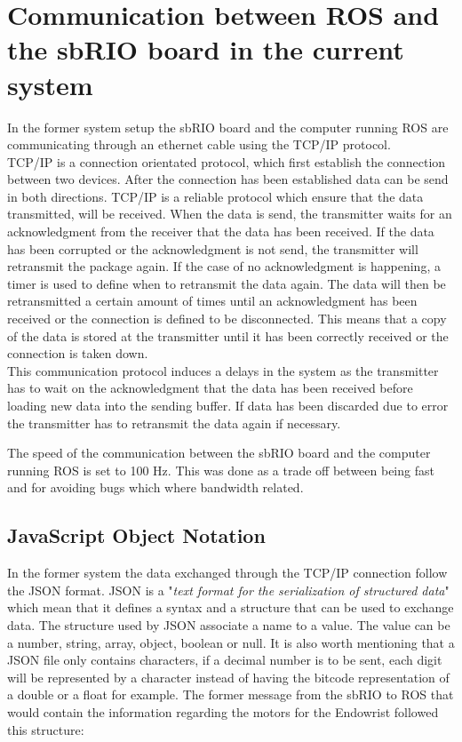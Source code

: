 \section{Communication between ROS and the sbRIO board in the current system}


In the former system setup the sbRIO board and the computer running ROS are communicating through an ethernet cable using the TCP/IP protocol.\\ 
TCP/IP is a connection orientated protocol, which first establish the connection between two devices\cite{TCP_IP_UDP}. After the connection has been established data can be send in both directions. TCP/IP is a reliable protocol which ensure that the data transmitted, will be received. When the data is send, the transmitter waits for an acknowledgment from the receiver that the data has been received. If the data has been corrupted or the acknowledgment is not send, the transmitter will retransmit the package again. If the case of no acknowledgment is happening, a timer is used to define when to retransmit the data again. The data will then be retransmitted a certain amount of times until an acknowledgment has been received or the connection is defined to be disconnected. This means that a copy of the data is stored at the transmitter until it has been correctly received or the connection is taken down.\\
This communication protocol induces a delays in the system as the transmitter has to wait on the acknowledgment that the data has been received before loading new data into the sending buffer. If data has been discarded due to error the transmitter has to retransmit the data again if necessary.  

The speed of the communication between the sbRIO board and the computer running ROS is set to 100 Hz. This was done as a trade off between being fast and for avoiding bugs which where bandwidth related\cite{Chris_Surgical}.

\subsection*{JavaScript Object Notation}
In the former system the data exchanged through the TCP/IP connection follow the \gls{JSON} format. \gls{JSON} is a "\textit{text format for the serialization of structured data}"\cite{JSON_IETF} which mean that it defines a syntax and a structure that can be used to exchange data. The structure used by \gls{JSON} associate a name to a value. The value can be a number, string, array, object, boolean or null. It is also worth mentioning that a \gls{JSON} file only contains characters, if a decimal number is to be sent, each digit will be represented by a character instead of having the bitcode representation of a double or a float for example. The former message from the sbRIO to ROS that would contain the information regarding the motors for the Endowrist followed this structure:

